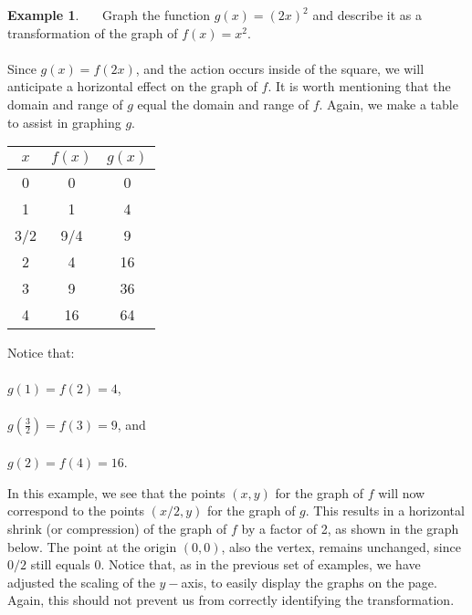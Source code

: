 \documentclass[11pt]{book}
\theoremstyle{definition}  %
\newtheorem{example}{Example}[chapter]
\begin{document}
\begin{example}~~~Graph the function $g(x)=(2x)^2$ and describe it as a transformation of the graph of $f(x)=x^2$.\\
~\\
Since $g(x)=f(2x)$, and the action occurs inside of the square, we will anticipate a horizontal effect on the graph of $f$.  It is worth mentioning that the domain and range of $g$ equal the domain and range of $f$.  Again, we make a table to assist in graphing $g$. 

\begin{multicols}{2}
\begin{center}
\begin{tabular}{c||c|c}
$x$ & $f(x)$ &  $g(x)$ \\
\hline
0 & 0 & 0 \\
1 & 1 &  4 \\
3/2 & 9/4 &  9 \\
2 & 4 &  16 \\
3 & 9 &  36 \\
4 & 16 & 64 \\
\end{tabular}
\end{center}
Notice that:\\
~\\
$g(1)=f(2)=4$,\\
~\\
$g\left(\frac{3}{2}\right)=f(3)=9$, and\\
~\\
$g(2)=f(4)=16$.
\end{multicols}
In this example, we see that the points $(x,y)$ for the graph of $f$ will now correspond to the points $(x/2,y)$ for the graph of $g$.  This results in a horizontal shrink (or compression) of the graph of $f$ by a factor of 2, as shown in the graph below.  The point at the origin $(0,0)$, also the vertex, remains unchanged, since $0/2$ still equals $0$.  Notice that, as in the previous set of examples, we have adjusted the scaling of the $y-$axis, to easily display the graphs on the page.  Again, this should not prevent us from correctly identifying the transformation.    

\end{example}
\end{document}
